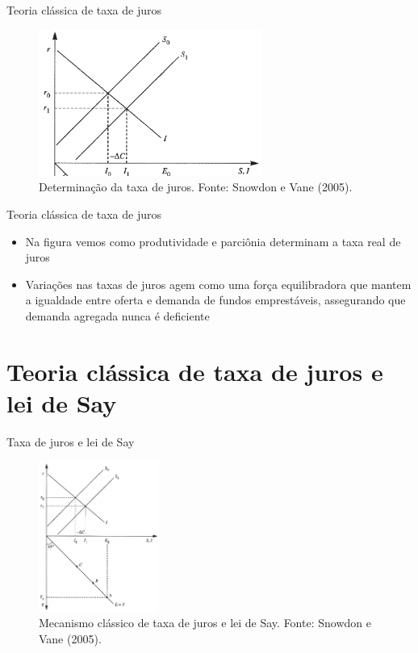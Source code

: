 \documentclass[10pt]{beamer}
\begin{document}
\begin{frame}{Teoria clássica de taxa de juros}
    \begin{figure}
        \centering
        \includegraphics[width=0.65\textwidth]{./figures/aula3_fig1.PNG}
        \caption{Determinação da taxa de juros. Fonte: Snowdon e Vane (2005).}
        \label{aula3_fig1}
    \end{figure}
\end{frame}

\begin{frame}
    {Teoria clássica de taxa de juros}
    \begin{itemize}
        \item Na figura vemos como produtividade e parciônia determinam a taxa real de juros\bigskip
        \item Variações nas taxas de juros agem como uma força equilibradora que mantem a igualdade entre oferta e demanda de fundos emprestáveis, assegurando que demanda agregada nunca é deficiente
    \end{itemize}
\end{frame}

\section{Teoria clássica de taxa de juros e lei de Say}
\begin{frame}{Taxa de juros e lei de Say}
    \begin{figure}
        \centering
        \includegraphics[width=0.35\textwidth]{./figures/aula3_fig2.PNG}
        \caption{Mecanismo clássico de taxa de juros e lei de Say. Fonte: Snowdon e Vane (2005).}
        \label{aula3_fig2}
    \end{figure}
\end{frame}
\end{document}
